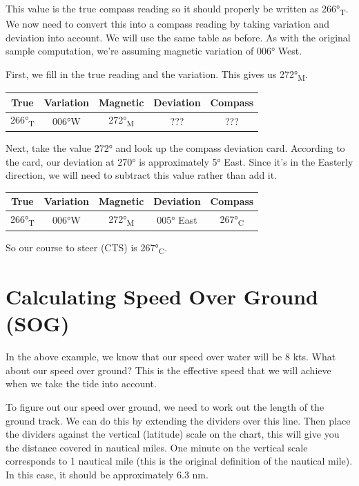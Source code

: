 \documentclass[a4paper,10pt,oneside]{book}
\begin{document}
This value is the true compass reading so it should properly be written as 266°\textsubscript{T}. We now need to convert this into a compass reading by taking variation and deviation into account. We will use the same table as before. As with the original sample computation, we’re assuming magnetic variation of 006° West.

\newpage
First, we fill in the true reading and the variation. This gives us 272°\textsubscript{M}. 

\begin{center}
	\begin{tabular}{|c|c|c|c|c|}
		\hline
		\textbf{True} & \textbf{Variation} & \textbf{Magnetic} & \textbf{Deviation} & \textbf{Compass} \\
		\hline
		266°\textsubscript{T} & 006°W & 272°\textsubscript{M} & ??? & ??? \\
		\hline
	\end{tabular}
\end{center}


Next, take the value 272° and look up the compass deviation card. According to the card, our deviation at 270° is approximately 5° East. Since it’s in the Easterly direction, we will need to subtract this value rather than add it.

\begin{center}
	\begin{tabular}{|c|c|c|c|c|}
		\hline
		\textbf{True} & \textbf{Variation} & \textbf{Magnetic} & \textbf{Deviation} & \textbf{Compass} \\
		\hline
		266°\textsubscript{T} & 006°W & 272°\textsubscript{M} & 005° East & 267°\textsubscript{C} \\
		\hline
	\end{tabular}
\end{center}

So our course to steer (CTS) is 267°\textsubscript{C}.


\newpage
\section{Calculating Speed Over Ground (SOG)}
In the above example, we know that our speed over water will be 8 kts. What about our speed over ground? This is the effective speed that we will achieve when we take the tide into account.

To figure out our speed over ground, we need to work out the length of the ground track. We can do this by extending the dividers over this line. Then place the dividers against the vertical (latitude) scale on the chart, this will give you the distance covered in nautical miles. One minute on the vertical scale corresponds to 1 nautical mile (this is the original definition of the nautical mile). In this case, it should be approximately 6.3 nm.
\end{document}
